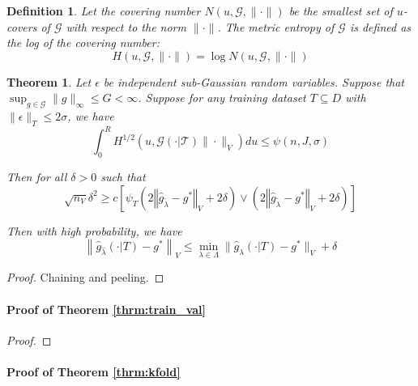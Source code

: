 \documentclass[12pt]{article}
\newtheorem{theorem}{Theorem}
\newtheorem{definition}{Definition}
\begin{document}
\begin{definition}
Let the covering number $N(u, \mathcal{G}, \| \cdot \|)$ be the smallest set of $u$-covers of $\mathcal{G}$ with respect to the norm $\| \cdot \|$. The metric entropy of $\mathcal{G}$ is defined as the log of the covering number:
\begin{equation}
H (u, \mathcal{G}, \| \cdot \| ) = \log N(u, \mathcal{G}, \| \cdot \|)
\end{equation}
\end{definition}

\begin{theorem}
\label{train_val_thrm_complicated}
Let $\epsilon$ be independent sub-Gaussian random variables.
Suppose that $\sup_{g \in \mathcal{G}} \| g \|_\infty \le G < \infty$.
Suppose for any training dataset $T \subseteq D$ with $\| \epsilon \|_T \le 2 \sigma$, we have
\begin{equation}
\int_0^R H^{1/2} \left ( u, \mathcal{G(\cdot | T)} \| \cdot \|_V \right ) du \le \psi(n, J, \sigma)
\end{equation}

Then for all $\delta  > 0$ such that
\begin{equation}
\sqrt{n_{V}}\delta^{2}
\ge
c \left[
\psi_{T}\left(2\left\Vert \hat{g}_{\tilde{\lambda}}-g^{*}\right\Vert _{V} + 2\delta\right)
\vee
\left(2\left\Vert \hat{g}_{\tilde{\lambda}}-g^{*}\right\Vert _{V}+2\delta\right)
\right]
\end{equation}

Then with high probability, we have
\begin{equation}
\left \|\hat{g}_{\hat{\lambda} }(\cdot | T) - g^* \right \|_V
\le
\min_{\lambda \in \Lambda}\| \hat{g}_{\lambda}(\cdot | T) - g^*\|_V
+ \delta
\end{equation}
\end{theorem}

\begin{proof}
Chaining and peeling.
\end{proof}


\paragraph{Proof of Theorem \ref{thrm:train_val}}

\begin{proof}

\end{proof}

\paragraph{Proof of Theorem \ref{thrm:kfold}}
\end{document}
